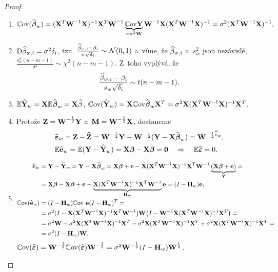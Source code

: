 \begin{theorem}
\begin{proof}
	\begin{enumerate}[1)]
		\item $$ \Cov (\wbetab_w) = \inv{(\X^T\inv{\textbf{W}}\X)}\X^T\inv{\textbf{W}}\underbrace{\Cov \Y}_{ = \sigma^2\textbf{W}}\inv{\textbf{W}}\X\inv{(\X^T\inv{\textbf{W}}\X)} = \sigma^2\inv{(\X^T\inv{\textbf{W}}\X)}, $$
		\item $\D \wbeta_{w,i} = \sigma^2\delta_i$, tzn. $\frac{\wbeta_{w,i}-\beta_i}{\sigma\sqrt{\delta_i}}\sim\NN(0,1)$ a~víme, že $\wbeta_{w,i}$ a~$s_w^2$ jsou nezávislé, $\frac{s_w^2(n-m-1)}{\sigma^2}\sim\chi^2(n-m-1)$. Z~toho vyplývá, že
		 $$ \frac{\wbeta_{w,i}-\beta_i}{s_w\sqrt{\delta_i}}\sim t(n-m-1). $$
		\item $\E \widehat{\Y}_w = \X\E \wbetab_w = \X\wbeta$, $\Cov(\widehat{\Y}_w) = \X\Cov\wbetab_w \X^T = \sigma^2\X\inv{(\X^T\inv{\textbf{W}}\X)}\X^T$.
		\item Protože $\textbf{Z} = \textbf{W}^{-\frac{1}{2}}\Y$ a~$\textbf{M} = \textbf{W}^{-\frac{1}{2}}\X$, dostaneme
		\[
		\begin{split}
		& \widehat{\boldsymbol{\epsilon}}_w = \textbf{Z}-\widehat{\textbf{Z}} = \textbf{W}^{-\frac{1}{2}}\Y-\textbf{W}^{-\frac{1}{2}}(\Y-\X\wbetab_w) = \textbf{W}^{-\frac{1}{2}\he_w},\\
		& \E \heb_w = \E(\Y-\widehat{\Y}_w) = \X\betab-\X\betab = \textbf{0}\quad\Rightarrow\quad \E \widehat{\boldsymbol{\epsilon}} = 0.
		\end{split}
		\]
		\item \[
		\begin{split}
		\heb_w& = \Y-\widehat{\Y}_w = \Y-\X\wbetab_w = \X\betab+\eb-\X\inv{(\X^T\inv{\textbf{W}}\X)}\X^T\inv{\textbf{W}}\underbrace{(\X\betab+\eb)}_{\Y} = \\& = \X\betab-\X\betab+\eb-\underbrace{\X\inv{(\X^T\inv{\textbf{W}}\X)}\X^T\inv{\textbf{W}}}_{\Hm_w}\eb = (I-\Hm_w)\eb,\\
		\Cov(\heb_w)& = (I-\Hm_w)\Cov~\eb(I-\Hm_w)^T = \\& = \sigma^2(I-\X\inv{(\X^T\inv{\textbf{W}}\X)}\X^T\inv{\textbf{W}})\textbf{W}\big(I-\inv{\textbf{W}}\X\inv{(\X^T\inv{\textbf{W}}\X)}\X^T\big) = \\& = \sigma^2\textbf{W}-\sigma^2\X\inv{(\X^T\inv{\textbf{W}}\X)}\X^T-\sigma^2\X\inv{(\X^T\inv{\textbf{W}}\X)}\X^T
+\sigma^2\X\inv{(\X^T\inv{\textbf{W}}\X)}\X^T = \\& = \sigma^2(I-\Hm_w)\textbf{W}.	\end{split}
		\]
		 $\Cov(\widehat{\boldsymbol{\epsilon}}) = \textbf{W}^{-\frac{1}{2}}\Cov(\widehat{\boldsymbol{\epsilon}})\textbf{W}^{-\frac{1}{2}} = \sigma^2\textbf{W}^{-\frac{1}{2}}(I-\Hm_w)\textbf{W}^{\frac{1}{2}}$.
	\end{enumerate}
\end{proof}
\end{theorem}
